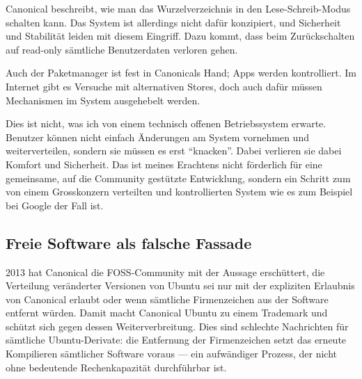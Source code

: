 Canonical beschreibt, wie man das Wurzelverzeichnis in den \mbox{Lese-Schreib-Modus} schalten kann\thinspace\cite{online:ubuntutouch-readwrite}. Das System ist allerdings nicht dafür konzipiert, und Sicherheit und Stabilität leiden mit diesem Eingriff. Dazu kommt, dass beim Zurückschalten auf \mbox{read-only} sämtliche Benutzerdaten verloren gehen.

Auch der Paketmanager ist fest in Canonicals Hand; Apps werden kontrolliert\thinspace\cite{online:ubuntutouch-publish}. Im Internet gibt es Versuche mit alternativen Stores, doch auch dafür müssen Mechanismen im System ausgehebelt werden\thinspace\cite{online:ubuntutouch-jailbreak}.

Dies ist nicht, was ich von einem technisch offenen Betriebssystem erwarte. Benutzer können nicht einfach Änderungen am System vornehmen und weiterverteilen, sondern sie müssen es erst ``knacken''. Dabei verlieren sie dabei Komfort und Sicherheit. Das ist meines Erachtens nicht förderlich für eine gemeinsame, auf die Community gestützte Entwicklung, sondern ein Schritt zum von einem Grosskonzern verteilten und kontrollierten System wie es zum Beispiel bei Google der Fall ist.
\newline

\subsection{Freie Software als falsche Fassade}
2013 hat Canonical die \mbox{FOSS-Community} mit der Aussage erschüttert, die Verteilung veränderter Versionen von Ubuntu sei nur mit der expliziten Erlaubnis von Canonical erlaubt oder wenn sämtliche Firmenzeichen aus der Software entfernt würden\thinspace\cite{online:ubuntutouch-mjgIn}. Damit macht Canonical Ubuntu zu einem Trademark und schützt sich gegen dessen Weiterverbreitung. Dies sind schlechte Nachrichten für sämtliche \mbox{Ubuntu-Derivate}: die Entfernung der Firmenzeichen setzt das erneute Kompilieren sämtlicher Software voraus\thinspace\cite{online:ubuntutouch-mjgLicense} --- ein aufwändiger Prozess, der nicht ohne bedeutende Rechenkapazität durchführbar ist.

